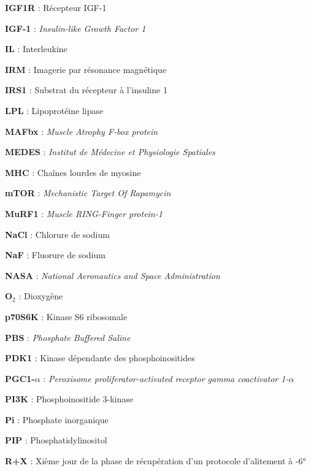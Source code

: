\documentclass[11pt]{report}
\begin{document}
{\begin{minipage}[t]{0.45\textwidth}
		\textbf{IGF1R} : Récepteur IGF-1
		
		\textbf{IGF-1} : \textit{Insulin-like Growth Factor 1}
		
		\textbf{IL} : Interleukine
		
		\textbf{IRM} : Imagerie par résonance magnétique
		
		\textbf{IRS1} : Substrat du récepteur à l'insuline 1
		
		\bigskip
		
		\textbf{LPL} : Lipoprotéine lipase

		
	\end{minipage}
	\hspace{1.8cm}
	\begin{minipage}[t]{0.45\textwidth}
			
		\textbf{MAFbx} : \textit{Muscle Atrophy F-box protein}
		
		\textbf{MEDES} : \textit{Institut de Médecine et Physiologie Spatiales}
		
		\textbf{MHC} : Chaînes lourdes de myosine
		
		\textbf{mTOR} : \textit{Mechanistic Target Of Rapamycin}
		
		\textbf{MuRF1} : \textit{Muscle RING-Finger protein-1}
		
		\bigskip
		
		\textbf{NaCl} : Chlorure de sodium
		
		\textbf{NaF} : Fluorure de sodium
		
		\textbf{NASA} : \textit{National Aeronautics and Space Administration}
		
		\bigskip
		
		\textbf{O$_2$} : Dioxygène
		
		\bigskip
		
		\textbf{p70S6K} : Kinase S6 ribosomale
		
		\textbf{PBS} : \textit{Phosphate Buffered Saline}
		
		\textbf{PDK1} : Kinase dépendante des phosphoinositides
		
		\textbf{PGC1-$\alpha$} : \textit{Peroxisome proliferator-activated receptor gamma coactivator 1-$\alpha$}
		
		\textbf{PI3K} : Phosphoinositide 3-kinase
		
		\textbf{Pi} : Phosphate inorganique
		
		\textbf{PIP} : Phosphatidylinositol
		
		\bigskip
		
		\textbf{R+X} : Xième jour de la phase de récupération d'un protocole d'alitement à -6°
		

\end{minipage}}
\end{document}

